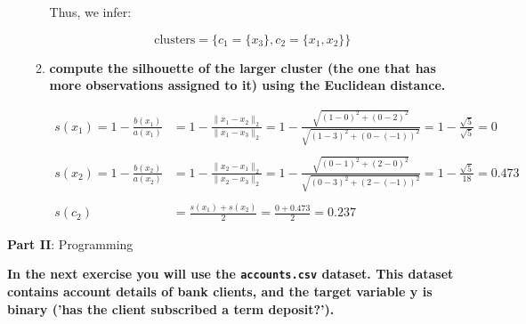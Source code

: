 \documentclass[12pt]{article}
\begin{document}
\begin{enumerate}
\begin{enumerate}[label=\alph*)]
        Thus, we infer:

        \begin{equation*}
                \text{clusters} = \{c_1=\{x_3\},c_2=\{x_1, x_2\}\}
        \end{equation*}

        \item \textbf{compute the silhouette of the larger cluster (the one that has more observations
        assigned to it) using the Euclidean distance.}

        \begin{equation*}
            \begin{aligned}
                s(x_1) = 1 - \frac{b(x_1)}{a(x_1)} &= 1 - \frac{\|x_1-x_2\|_2}{\|x_1-x_3\|_2} = 1 - \frac{\sqrt{(1-0)^2+(0-2)^2}}{\sqrt{(1-3)^2+(0-(-1))^2}} = 1 - \frac{\sqrt{5}}{\sqrt{5}} = 0\\
                \\
                s(x_2) = 1 - \frac{b(x_2)}{a(x_2)} &= 1 - \frac{\|x_2-x_1\|_2}{\|x_2-x_3\|_2} = 1- \frac{\sqrt{(0-1)^2+(2-0)^2}}{\sqrt{(0-3)^2+(2-(-1))^2}} = 1 - \frac{\sqrt{5}}{18} = 0.473\\
                \\
                s(c_2) &= \frac{s(x_1) + s(x_2)}{2} = \frac{0+0.473}{2} = 0.237
            \end{aligned}
        \end{equation*}

    \end{enumerate}
\end{enumerate}

\vspace{20pt}
\large{\textbf{Part II}: Programming}\normalsize

\vspace{20pt}
\textbf{In the next exercise you will use the \texttt{accounts.csv} dataset. This dataset contains account details
of bank clients, and the target variable y is binary ('has the client subscribed a term deposit?').}
\end{document}
